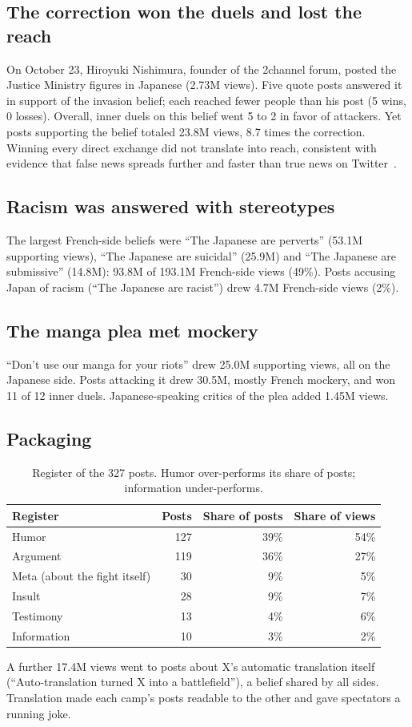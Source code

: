 \documentclass[10pt,a4paper]{article}
\begin{document}
\subsection{The correction won the duels and lost the reach}
On October 23, Hiroyuki Nishimura, founder of the 2channel forum, posted the Justice Ministry figures in Japanese (2.73M views). Five quote posts answered it in support of the invasion belief; each reached fewer people than his post (5 wins, 0 losses). Overall, inner duels on this belief went 5 to 2 in favor of attackers. Yet posts supporting the belief totaled 23.8M views, 8.7 times the correction. Winning every direct exchange did not translate into reach, consistent with evidence that false news spreads further and faster than true news on Twitter~\cite{vosoughi}.

\subsection{Racism was answered with stereotypes}
The largest French-side beliefs were ``The Japanese are perverts'' (53.1M supporting views), ``The Japanese are suicidal'' (25.9M) and ``The Japanese are submissive'' (14.8M): 93.8M of 193.1M French-side views (49\%). Posts accusing Japan of racism (``The Japanese are racist'') drew 4.7M French-side views (2\%).

\subsection{The manga plea met mockery}
``Don't use our manga for your riots'' drew 25.0M supporting views, all on the Japanese side. Posts attacking it drew 30.5M, mostly French mockery, and won 11 of 12 inner duels. Japanese-speaking critics of the plea added 1.45M views.

\subsection{Packaging}
\begin{table}[h]
\centering\small
\begin{tabular}{lrrr}
\toprule
Register & Posts & Share of posts & Share of views\\
\midrule
Humor & 127 & 39\% & 54\%\\
Argument & 119 & 36\% & 27\%\\
Meta (about the fight itself) & 30 & 9\% & 5\%\\
Insult & 28 & 9\% & 7\%\\
Testimony & 13 & 4\% & 6\%\\
Information & 10 & 3\% & 2\%\\
\bottomrule
\end{tabular}
\caption{Register of the 327 posts. Humor over-performs its share of posts; information under-performs.}
\label{tab:register}
\end{table}
A further 17.4M views went to posts about X's automatic translation itself (``Auto-translation turned X into a battlefield''), a belief shared by all sides. Translation made each camp's posts readable to the other and gave spectators a running joke.
\end{document}
